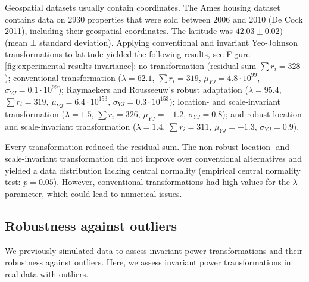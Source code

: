 \documentclass[preprint,12pt,authoryear]{elsarticle}
\begin{document}
Geospatial datasets usually contain coordinates. The Ames housing
dataset contains data on 2930 properties that were sold between 2006 and
2010 (De Cock 2011), including their geospatial coordinates. The
latitude was \(42.03 \pm 0.02)\) (mean ± standard deviation). Applying
conventional and invariant Yeo-Johnson transformations to latitude
yielded the following results, see Figure
\ref{fig:experimental-results-invariance}: no transformation (residual
sum \(\sum r_i = 328\)); conventional transformation
(\(\lambda = 62.1\), \(\sum r_i = 319\),
\(\mu_{YJ} = 4.8 \cdot 10^{99}\), \(\sigma_{YJ} = 0.1 \cdot 10^{99}\));
Raymaekers and Rousseeuw's robust adaptation (\(\lambda = 95.4\),
\(\sum r_i = 319\), \(\mu_{YJ} = 6.4 \cdot 10^{153}\),
\(\sigma_{YJ} = 0.3 \cdot 10^{153}\)); location- and scale-invariant
transformation (\(\lambda = 1.5\), \(\sum r_i = 326\),
\(\mu_{YJ} = -1.2\), \(\sigma_{YJ} = 0.8\)); and robust location- and
scale-invariant transformation (\(\lambda = 1.4\), \(\sum r_i = 311\),
\(\mu_{YJ} = -1.3\), \(\sigma_{YJ} = 0.9\)).

Every transformation reduced the residual sum. The non-robust location-
and scale-invariant transformation did not improve over conventional
alternatives and yielded a data distribution lacking central normality
(empirical central normality test: \(p=0.05\)). However, conventional
transformations had high values for the \(\lambda\) parameter, which
could lead to numerical issues.

\subsection{Robustness against
outliers}\label{robustness-against-outliers}

We previously simulated data to assess invariant power transformations
and their robustness against outliers. Here, we assess invariant power
transformations in real data with outliers.
\end{document}
